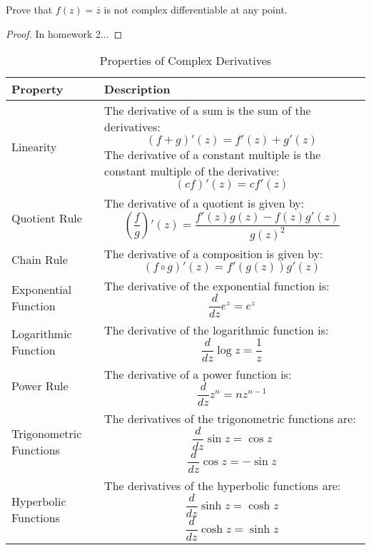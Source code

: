 \begin{example}
    Prove that $f(z) = \overline{z}$ is not complex differentiable at any point.
\end{example}
\begin{proof}
    In homework 2...
\end{proof}

\begin{table}[htbp]
    \centering
    \begin{tabular}{| m{5cm} | m{9cm} |}
        \hline
        \textbf{Property}       & \textbf{Description}                                                                                                                                                                               \\
        \hline
        Linearity               & The derivative of a sum is the sum of the derivatives: \[ (f + g)'(z) = f'(z) + g'(z) \] The derivative of a constant multiple is the constant multiple of the derivative: \[ (cf)'(z) = cf'(z) \] \\
        \hline
        Quotient Rule           & The derivative of a quotient is given by: \[ \left( \frac{f}{g} \right)'(z) = \frac{f'(z)g(z) - f(z)g'(z)}{g(z)^2} \]                                                                              \\
        \hline
        Chain Rule              & The derivative of a composition is given by: \[ (f \circ g)'(z) = f'(g(z))g'(z) \]                                                                                                                 \\
        \hline
        Exponential Function    & The derivative of the exponential function is: \[ \frac{d}{dz} e^z = e^z \]                                                                                                                        \\
        \hline
        Logarithmic Function    & The derivative of the logarithmic function is: \[ \frac{d}{dz} \log z = \frac{1}{z} \]                                                                                                             \\
        \hline
        Power Rule              & The derivative of a power function is: \[ \frac{d}{dz} z^n = nz^{n-1} \]                                                                                                                           \\
        \hline
        Trigonometric Functions & The derivatives of the trigonometric functions are: \[ \frac{d}{dz} \sin z = \cos z \] \[ \frac{d}{dz} \cos z = -\sin z \]                                                                         \\
        \hline
        Hyperbolic Functions    & The derivatives of the hyperbolic functions are: \[ \frac{d}{dz} \sinh z = \cosh z \] \[ \frac{d}{dz} \cosh z = \sinh z \]                                                                         \\
        \hline
    \end{tabular}
    \caption{Properties of Complex Derivatives}
    \label{table:complex_derivative_properties}
\end{table}

